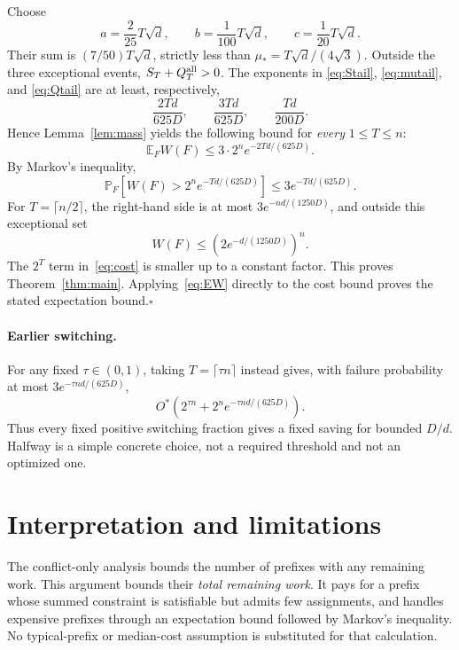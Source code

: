 \documentclass[11pt,a4paper]{article}
\theoremstyle{remark}
\newcommand{\Ostar}{O^{*}}
\newcommand{\E}{\mathbb E}
\newcommand{\Prb}{\mathbb P}
\begin{document}
Choose
\[
 a=\frac{2}{25}T\sqrt d,\qquad
 b=\frac1{100}T\sqrt d,\qquad
 c=\frac1{20}T\sqrt d.
\]
Their sum is $(7/50)T\sqrt d$, strictly less than
$\mu_*=T\sqrt d/(4\sqrt3)$. Outside the three exceptional events,
$S_T+Q_T^{\rm all}>0$. The exponents in
\eqref{eq:Stail}, \eqref{eq:mutail}, and \eqref{eq:Qtail} are at least,
respectively,
\[
 \frac{2Td}{625D},\qquad
 \frac{3Td}{625D},\qquad
 \frac{Td}{200D}.
\]
Hence Lemma~\ref{lem:mass} yields the following bound for \emph{every}
$1\le T\le n$:
\begin{equation}
 \E_F W(F)\le3\cdot2^n e^{-2Td/(625D)}.             \label{eq:EW}
\end{equation}
By Markov's inequality,
\begin{equation}
 \Prb_F\left[W(F)>2^n e^{-Td/(625D)}\right]
 \le3e^{-Td/(625D)}.                               \label{eq:Markov}
\end{equation}
For $T=\lceil n/2\rceil$, the right-hand side is at most
$3e^{-nd/(1250D)}$, and outside this exceptional set
\[
 W(F)\le(2e^{-d/(1250D)})^n.
\]
The $2^T$ term in~\eqref{eq:cost} is smaller up to a constant factor.
This proves Theorem~\ref{thm:main}. Applying~\eqref{eq:EW} directly to
the cost bound proves the stated expectation bound.\hfill$\square$

\paragraph{Earlier switching.}
For any fixed $\tau\in(0,1)$, taking $T=\lceil\tau n\rceil$ instead
gives, with failure probability at most $3e^{-\tau nd/(625D)}$,
\[
 \Ostar\left(2^{\tau n}+2^n e^{-\tau nd/(625D)}\right).
\]
Thus every fixed positive switching fraction gives a fixed saving for
bounded $D/d$. Halfway is a simple concrete choice, not a required
threshold and not an optimized one.

\section{Interpretation and limitations}

The conflict-only analysis bounds the number of prefixes with any
remaining work. This argument bounds their \emph{total remaining work}.
It pays for a prefix whose summed constraint is satisfiable but admits
few assignments, and handles expensive prefixes through an expectation
bound followed by Markov's inequality. No typical-prefix or median-cost
assumption is substituted for that calculation.
\end{document}
